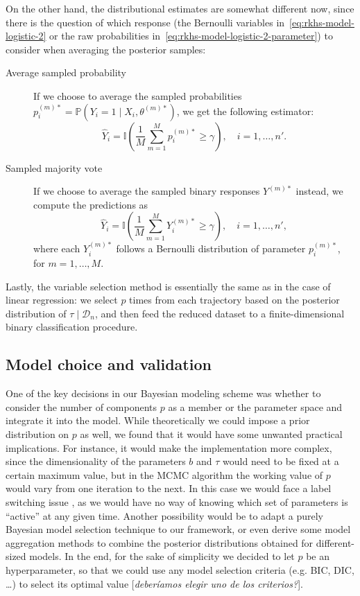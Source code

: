 \documentclass[ba]{imsart}
\numberwithin{equation}{section}
\theoremstyle{plain}
\newcommand\incomment[2][comment-red]{\color{#1}[\textit{#2}]\color{black}}
\begin{document}
On the other hand, the distributional estimates are somewhat different now, since there is the question of which response (the Bernoulli variables in~\eqref{eq:rkhs-model-logistic-2} or the raw probabilities in~\eqref{eq:rkhs-model-logistic-2-parameter}) to consider when averaging the posterior samples:
\begin{description}
  \item[Average sampled probability] If we choose to average the sampled probabilities \(p_i^{(m)*} = \mathbb P(Y_i =1 \mid X_i,\theta^{(m)*})\), we get the following estimator:
  \[
    \hat Y_i = \mathbb I\left(\frac{1}{M} \sum_{m=1}^M p_i^{(m)*} \geq \gamma\right), \quad i=1,\dots,n'.
  \]
  \item[Sampled majority vote] If we choose to average the sampled binary responses \(Y^{(m)*}\) instead, we compute the predictions as
\[
  \hat Y_i = \mathbb I\left(\frac{1}{M} \sum_{m=1}^M Y_i^{(m)*} \geq \gamma\right), \quad i=1,\dots,n',
\]
where each \(Y_i^{(m)*}\) follows a Bernoulli distribution of parameter \(p_i^{(m)*}\), for \(m=1,\dots,M\).
\end{description}

Lastly, the variable selection method is essentially the same as in the case of linear regression: we select \(p\) times from each trajectory based on the posterior distribution of \(\tau\mid \mathcal D_n\), and then feed the reduced dataset to a finite-dimensional binary classification procedure.

\subsection{Model choice and validation}\label{sec:model-choice}

One of the key decisions in our Bayesian modeling scheme was whether to consider the number of components \(p\) as a member or the parameter space and integrate it into the model. While theoretically we could impose a prior distribution on \(p\) as well, we found that it would have some unwanted practical implications. For instance, it would make the implementation more complex, since the dimensionality of the parameters \(b\) and \(\tau\) would need to be fixed at a certain maximum value, but in the MCMC algorithm the working value of \(p\) would vary from one iteration to the next. In this case we would face a label switching issue \citep[c.f.][Sec.~2.3]{grollemund2019bayesian}, as we would have no way of knowing which set of parameters is ``active'' at any given time. Another possibility would be to adapt a purely Bayesian model selection technique \citep[see][Ch.~7]{piironen2017comparison, gelman1995bayesian} to our framework, or even derive some model aggregation methods to combine the posterior distributions obtained for different-sized models. In the end, for the sake of simplicity we decided to let \(p\) be an hyperparameter, so that we could use any model selection criteria (e.g. BIC, DIC, \ldots) to select its optimal value \incomment{deberíamos elegir uno de los criterios?}.
\end{document}
